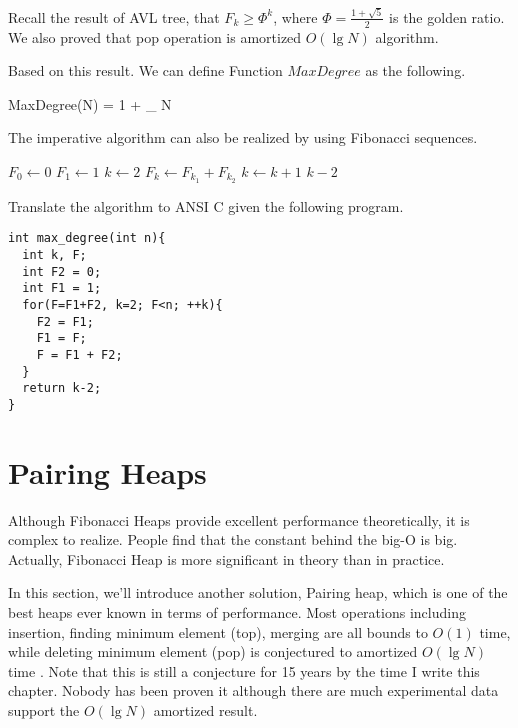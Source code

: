 \documentclass{article}
\begin{document}
Recall the result of AVL tree, that $F_k \geq \Phi^k$, where
$\Phi = \frac{1+\sqrt{5}}{2}$ is the golden ratio. We also proved
that pop operation is amortized $O(\lg N)$ algorithm.

Based on this result. We can define Function $MaxDegree$ as the following.

\be
  MaxDegree(N) = 1 + \lfloor \log_{\Phi} N \rfloor
\ee

The imperative  algorithm can also be realized by 
using Fibonacci sequences.

\begin{algorithmic}[1]
  \State $F_0 \gets 0$
  \State $F_1 \gets 1$
  \State $k \gets 2$
  \Repeat
    \State $F_k \gets F_{k_1} + F_{k_2}$
    \State $k \gets k+1$
  \State \Return $k-2$
\EndFunction
\end{algorithmic}

Translate the algorithm to ANSI C given the following program.

\lstset{language=C}
\begin{lstlisting}
int max_degree(int n){
  int k, F;
  int F2 = 0; 
  int F1 = 1;
  for(F=F1+F2, k=2; F<n; ++k){
    F2 = F1;
    F1 = F;
    F = F1 + F2;
  }
  return k-2;
}
\end{lstlisting}


\section{Pairing Heaps}
\label{pairing-heap} 
Although Fibonacci Heaps provide excellent performance theoretically,
it is complex to realize. People find that the constant behind the
big-O is big. Actually, Fibonacci Heap is more significant in theory
than in practice.

In this section, we'll introduce another solution, Pairing heap,
which is one of the best heaps ever known in terms of performance. 
Most operations including insertion, finding minimum element (top), 
merging are all bounds to $O(1)$ time, while deleting minimum element (pop)
is conjectured to amortized $O(\lg N)$ time \cite{pairing-heap} 
\cite{okasaki-book}. Note that this is still
a conjecture for 15 years by the time I write this chapter. Nobody has been 
proven it although there are much experimental data support the
$O(\lg N)$ amortized result.
\end{document}
